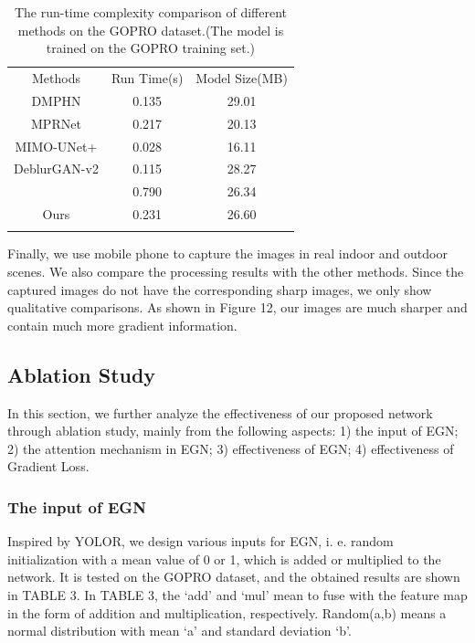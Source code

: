 \begin{sloppypar}
\begin{table}[!t]
\renewcommand{\arraystretch}{1.3}
\caption{The  run-time complexity comparison of different methods on the GOPRO dataset.(The model is trained on the GOPRO training set.)}
\label{table2}
\centering
\begin{tabular}{ccc}
\hline\noalign{\smallskip}
Methods & Run Time(s) & Model Size(MB) \\
\noalign{\smallskip}\hline\noalign{\smallskip}
DMPHN & 0.135 & 29.01 \\
MPRNet & 0.217 & 20.13 \\
MIMO-UNet+  & 0.028 & 16.11 \\
DeblurGAN-v2 & 0.115 & 28.27 \\
\cite{26} & 0.790 & 26.34 \\
Ours & 0.231 & 26.60 \\
\noalign{\smallskip}\hline
\end{tabular}
\end{table}


Finally, we use mobile phone to capture the images in real indoor and outdoor scenes. We also compare the processing results with the other methods. Since the captured images do not have the corresponding sharp images, we only show qualitative comparisons. As shown in Figure 12, our images are much sharper and contain much more gradient information.

\subsection{Ablation Study}
In this section, we further analyze the effectiveness of our proposed network through ablation study, mainly from the following aspects: 1) the input of EGN; 2) the attention mechanism in EGN; 3) effectiveness of EGN; 4) effectiveness of Gradient Loss.
\subsubsection{The input of EGN}
Inspired by YOLOR\cite{27}, we design various inputs for EGN, i. e. random initialization with a mean value of 0 or 1, which is added or multiplied to the network. It is tested on the GOPRO dataset, and the obtained results are shown in TABLE 3. In TABLE 3, the ‘add’ and ‘mul’ mean to fuse with the feature map in the form of addition and multiplication, respectively. Random(a,b) means a normal distribution with mean ‘a’ and standard deviation ‘b’.


\end{sloppypar}
